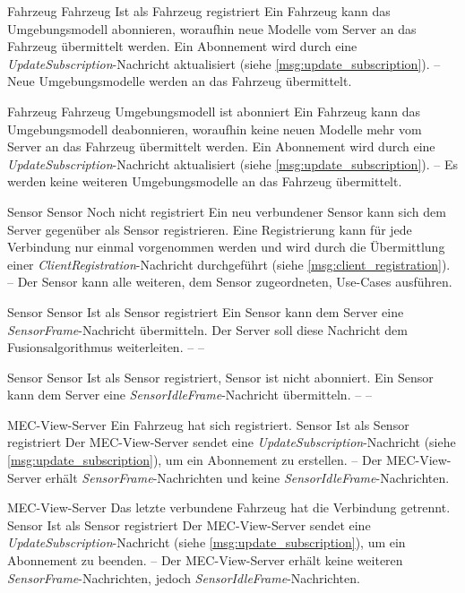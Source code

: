 	{Fahrzeug}
	{Fahrzeug}
	{Ist als Fahrzeug registriert}
	{Ein Fahrzeug kann das Umgebungsmodell abonnieren, woraufhin neue Modelle vom Server an das Fahrzeug übermittelt werden.
		Ein Abonnement wird durch eine \textit{UpdateSubscription}-Nachricht aktualisiert (siehe \autoref{msg:update_subscription}).}
	{--}
	{Neue Umgebungsmodelle werden an das Fahrzeug übermittelt.}
	
	
	{Fahrzeug}
	{Fahrzeug}
	{Umgebungsmodell ist abonniert}
	{Ein Fahrzeug kann das Umgebungsmodell deabonnieren, woraufhin keine neuen Modelle mehr vom Server an das Fahrzeug übermittelt werden.
		Ein Abonnement wird durch eine \textit{UpdateSubscription}-Nachricht aktualisiert (siehe \autoref{msg:update_subscription}).}
	{--}
	{Es werden keine weiteren Umgebungsmodelle an das Fahrzeug übermittelt.}

	{Sensor}
	{Sensor}
	{Noch nicht registriert}
	{Ein neu verbundener Sensor kann sich dem Server gegenüber als Sensor registrieren.
		Eine Registrierung kann für jede Verbindung nur einmal vorgenommen werden und wird durch die Übermittlung einer \textit{ClientRegistration}-Nachricht durchgeführt (siehe \autoref{msg:client_registration}).}
	{--}
	{Der Sensor kann alle weiteren, dem Sensor zugeordneten, Use-Cases ausführen.}

	{Sensor}
	{Sensor}
	{Ist als Sensor registriert}
	{Ein Sensor kann dem Server eine \textit{SensorFrame}-Nachricht übermitteln.
		Der Server soll diese Nachricht dem Fusionsalgorithmus weiterleiten.}
	{--}
	{--}

	{Sensor}
	{Sensor}
	{Ist als Sensor registriert, Sensor ist nicht abonniert.}
	{Ein Sensor kann dem Server eine \textit{SensorIdleFrame}-Nachricht übermitteln.}
	{--}
	{--}
	

	{MEC-View-Server}
	{Ein Fahrzeug hat sich registriert.}
	{Sensor}
	{Ist als Sensor registriert}
	{Der MEC-View-Server sendet eine \textit{UpdateSubscription}-Nachricht (siehe \autoref{msg:update_subscription}), um ein Abonnement zu erstellen.}
	{--}
	{Der MEC-View-Server erhält \textit{SensorFrame}-Nachrichten und keine \textit{SensorIdleFrame}-Nachrichten.}
	
	{MEC-View-Server}
	{Das letzte verbundene Fahrzeug hat die Verbindung getrennt.}
	{Sensor}
	{Ist als Sensor registriert}
	{Der MEC-View-Server sendet eine \textit{UpdateSubscription}-Nachricht (siehe \autoref{msg:update_subscription}), um ein Abonnement zu beenden.}
	{--}
	{Der MEC-View-Server erhält keine weiteren \textit{SensorFrame}-Nachrichten, jedoch \textit{SensorIdleFrame}-Nachrichten.}
	


